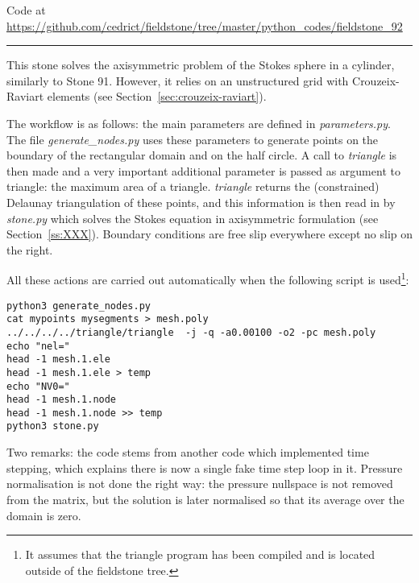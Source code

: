 

\begin{center}
Code at \url{https://github.com/cedrict/fieldstone/tree/master/python_codes/fieldstone_92}
\end{center}

\par\noindent\rule{\textwidth}{0.4pt}



This stone solves the axisymmetric problem of the Stokes sphere in a cylinder, 
similarly to Stone 91. However, it relies on an unstructured grid with 
Crouzeix-Raviart elements 
(see Section~\ref{sec:crouzeix-raviart}).

The workflow is as follows: the main parameters are defined in {\sl parameters.py}.
The file {\sl generate\_nodes.py} uses these parameters to generate points on the 
boundary of the rectangular domain and on the half circle. 
A call to {\sl triangle} is then made and a very important additional parameter is passed
as argument to triangle: the maximum area of a triangle. 
{\sl triangle} returns the (constrained) Delaunay triangulation of these points, 
and this information is then read in by {\sl stone.py} which solves the 
Stokes equation in axisymmetric formulation (see Section~\ref{ss:XXX}). 
Boundary conditions are free slip everywhere except no slip on the right. 

All these actions are carried out automatically when the following script is 
used\footnote{It assumes that the triangle program has been compiled and 
is located outside of the fieldstone tree.}:
\begin{lstlisting}
python3 generate_nodes.py
cat mypoints mysegments > mesh.poly
../../../../triangle/triangle  -j -q -a0.00100 -o2 -pc mesh.poly
echo "nel="
head -1 mesh.1.ele 
head -1 mesh.1.ele > temp
echo "NV0="
head -1 mesh.1.node 
head -1 mesh.1.node >> temp
python3 stone.py
\end{lstlisting}

Two remarks: the code stems from another code which implemented time stepping, 
which explains there is now a single fake time step loop in it. 
Pressure normalisation is not done the right way: the pressure nullspace is 
not removed from the matrix, but the solution is later normalised so that 
its average over the domain is zero.

